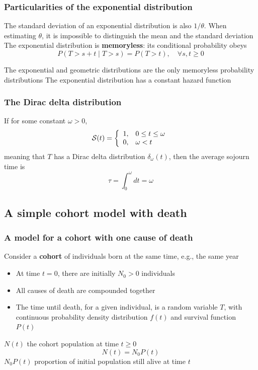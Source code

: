 \documentclass[aspectratio=169]{beamer}\usepackage[]{graphicx}\usepackage[]{xcolor}
\begin{document}
\begin{frame}\frametitle{Particularities of the exponential distribution}
The standard deviation of an exponential distribution is also $1/\theta$. When estimating $\theta$, it is impossible to distinguish the mean and the standard deviation
\vfill
The exponential distribution is \textbf{memoryless}: its conditional probability obeys
\[
P(T > s + t\; |\; T > s) = P(T > t),\quad\forall s, t \ge 0
\]

The exponential and geometric distributions are the only memoryless probability distributions
\vfill
The exponential distribution has a constant hazard function
\end{frame}

\begin{frame}\frametitle{The Dirac delta distribution}
If for some constant $\omega>0$,
\[
\S(t)=
\left\{
\begin{array}{ll}
1, & 0\leq t\leq\omega \\
0, & \omega<t
\end{array}
\right.
\]
meaning that $T$ has a Dirac delta distribution
$\delta_\omega(t)$, then the average sojourn time is
\[
\tau=\int_0^\omega dt=\omega
\]
\end{frame}


\subsection{A simple cohort model with death} 

\begin{frame}\frametitle{A model for a cohort with one cause of death}
Consider a \textbf{cohort} of individuals born at the same time, e.g., the same year
\vfill
\begin{itemize}
\item At time $t=0$, there are initially $N_0>0$ individuals
\item All causes of death are compounded together 
\item The time until death, for a given individual, is a random variable $T$, with continuous probability density distribution $f(t)$ and survival function $P(t)$
\end{itemize}
\vfill
$N(t)$ the cohort population at time $t\geq 0$
\begin{equation}\label{eq:N_general}
N(t)=N_0P(t)
\end{equation}
\vfill
$N_0P(t)$ proportion of initial population still alive at time $t$
\end{frame}
\end{document}
